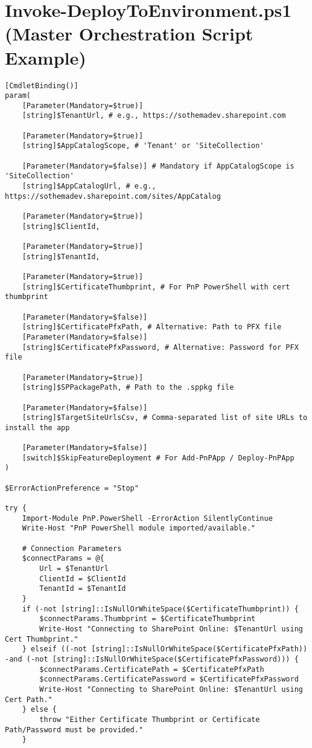 \section{Invoke-DeployToEnvironment.ps1 (Master Orchestration Script Example)}
\begin{verbatim}
[CmdletBinding()]
param(
    [Parameter(Mandatory=$true)]
    [string]$TenantUrl, # e.g., https://sothemadev.sharepoint.com

    [Parameter(Mandatory=$true)]
    [string]$AppCatalogScope, # 'Tenant' or 'SiteCollection'

    [Parameter(Mandatory=$false)] # Mandatory if AppCatalogScope is 'SiteCollection'
    [string]$AppCatalogUrl, # e.g., https://sothemadev.sharepoint.com/sites/AppCatalog

    [Parameter(Mandatory=$true)]
    [string]$ClientId,

    [Parameter(Mandatory=$true)]
    [string]$TenantId,

    [Parameter(Mandatory=$true)]
    [string]$CertificateThumbprint, # For PnP PowerShell with cert thumbprint

    [Parameter(Mandatory=$false)]
    [string]$CertificatePfxPath, # Alternative: Path to PFX file
    [Parameter(Mandatory=$false)]
    [string]$CertificatePfxPassword, # Alternative: Password for PFX file

    [Parameter(Mandatory=$true)]
    [string]$SPPackagePath, # Path to the .sppkg file

    [Parameter(Mandatory=$false)]
    [string]$TargetSiteUrlsCsv, # Comma-separated list of site URLs to install the app

    [Parameter(Mandatory=$false)]
    [switch]$SkipFeatureDeployment # For Add-PnPApp / Deploy-PnPApp
)

$ErrorActionPreference = "Stop"

try {
    Import-Module PnP.PowerShell -ErrorAction SilentlyContinue
    Write-Host "PnP PowerShell module imported/available."

    # Connection Parameters
    $connectParams = @{
        Url = $TenantUrl
        ClientId = $ClientId
        TenantId = $TenantId
    }
    if (-not [string]::IsNullOrWhiteSpace($CertificateThumbprint)) {
        $connectParams.Thumbprint = $CertificateThumbprint
        Write-Host "Connecting to SharePoint Online: $TenantUrl using Cert Thumbprint."
    } elseif ((-not [string]::IsNullOrWhiteSpace($CertificatePfxPath)) -and (-not [string]::IsNullOrWhiteSpace($CertificatePfxPassword))) {
        $connectParams.CertificatePath = $CertificatePfxPath
        $connectParams.CertificatePassword = $CertificatePfxPassword
        Write-Host "Connecting to SharePoint Online: $TenantUrl using Cert Path."
    } else {
        throw "Either Certificate Thumbprint or Certificate Path/Password must be provided."
    }


\end{verbatim}
